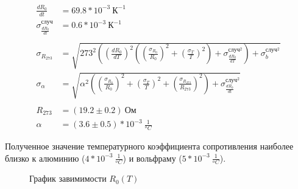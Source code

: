 \documentclass[a4paper, 12pt]{article}
\begin{document}
            \begin{align*}
                \frac{dR_0}{dt} &= 69.8 * 10^{-3}~К^{-1}\\
                \sigma_{\frac{dR_0}{dt}}^{случ} &= 0.6 * 10^{-3}~К^{-1}\\
                \\
                \sigma_{R_{273}} &= \sqrt{273^2 \left( \left( \frac{dR_0}{dT} \right)^2 \left( \left( \frac{\sigma_{R_0}}{R_0} \right)^2 + \left( \frac{\sigma_{T}}{T} \right)^2 \right) + \sigma_{\frac{dR_0}{dT}}^{случ^2} \right) + \sigma_b^{случ^2}} \\
                \sigma_{\alpha} &= \sqrt{ \alpha^2 \left( \left( \frac{\sigma_{R_0}}{R_0} \right)^2 + \left( \frac{\sigma_T}{T} \right)^2 + \left( \frac{\sigma_{R_{273}}}{R_{273}} \right)^2 \right) + \sigma_{\frac{dR_0}{dt}}^{случ^2} }\\
                \\
                R_{273} &= (19.2 \pm 0.2)~Ом\\
                \alpha &= (3.6 \pm 0.5)*10^{-3}~\frac{1}{^oC}
            \end{align*}

            Полученное значение температурного коэффициента сопротивления наиболее близко к алюминию ($4*10^{-3}~\frac{1}{^oC}$) и вольфраму ($5*10^{-3}~\frac{1}{^oC}$).

            \begin{figure}[ht]
                \caption{График завимимости $R_0(T)$}
                \label{RT_graph}
            \end{figure}
\end{document}
